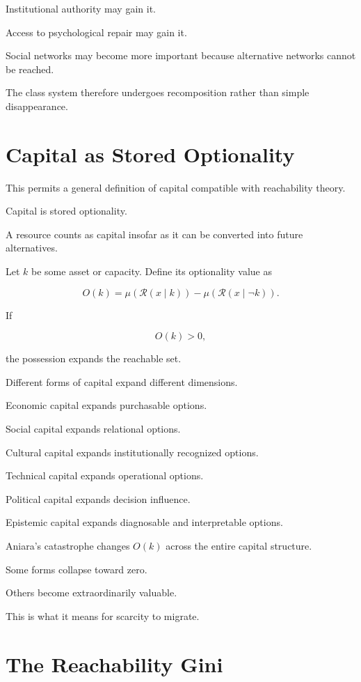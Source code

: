 \documentclass[11pt,oneside]{book}
\theoremstyle{definition}
\theoremstyle{remark}
\newcommand{\R}{\mathcal{R}}
\begin{document}
Institutional authority may gain it.

Access to psychological repair may gain it.

Social networks may become more important because alternative networks cannot be reached.

The class system therefore undergoes recomposition rather than simple disappearance.

\section{Capital as Stored Optionality}

This permits a general definition of capital compatible with reachability theory.

Capital is stored optionality.

A resource counts as capital insofar as it can be converted into future alternatives.

Let \(k\) be some asset or capacity. Define its optionality value as

\[
O(k)
=
\mu(\R(x\mid k))
-
\mu(\R(x\mid\neg k)).
\]

If

\[
O(k)>0,
\]

the possession expands the reachable set.

Different forms of capital expand different dimensions.

Economic capital expands purchasable options.

Social capital expands relational options.

Cultural capital expands institutionally recognized options.

Technical capital expands operational options.

Political capital expands decision influence.

Epistemic capital expands diagnosable and interpretable options.

Aniara's catastrophe changes \(O(k)\) across the entire capital structure.

Some forms collapse toward zero.

Others become extraordinarily valuable.

This is what it means for scarcity to migrate.

\section{The Reachability Gini}
\end{document}
